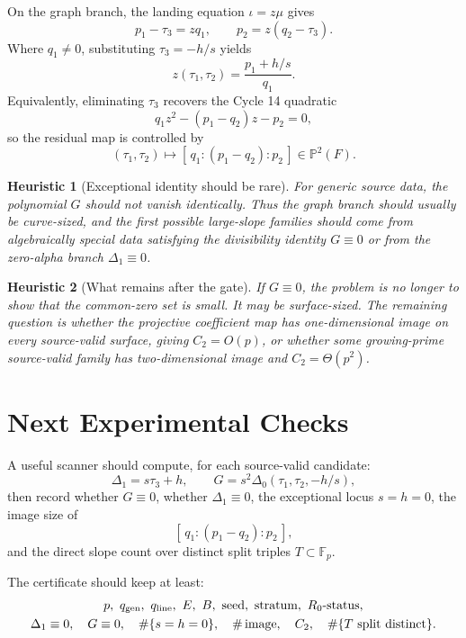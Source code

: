 \documentclass[11pt]{article}
\newtheorem{heuristic}{Heuristic}
\newcommand{\F}{\mathbb F}
\newcommand{\Deltaone}{\Delta_1}
\newcommand{\Deltazero}{\Delta_0}
\newcommand{\tauone}{\tau_1}
\newcommand{\tautwo}{\tau_2}
\newcommand{\tauthree}{\tau_3}
\newcommand{\Ctwo}{C_2}
\newcommand{\qline}{q_{\rm line}}
\newcommand{\qgen}{q_{\rm gen}}
\begin{document}
On the graph branch, the landing equation \(\iota=z\mu\) gives
\[
  p_1-\tauthree=zq_1,\qquad p_2=z(q_2-\tauthree).
\]
Where \(q_1\ne0\), substituting \(\tauthree=-h/s\) yields
\[
  z(\tauone,\tautwo)=\frac{p_1+h/s}{q_1}.
\]
Equivalently, eliminating \(\tauthree\) recovers the Cycle 14 quadratic
\[
  q_1z^2-(p_1-q_2)z-p_2=0,
\]
so the residual map is controlled by
\[
  (\tauone,\tautwo)\longmapsto [\,q_1:(p_1-q_2):p_2\,]\in\mathbb P^2(F).
\]

\begin{heuristic}[Exceptional identity should be rare]
For generic source data, the polynomial \(G\) should not vanish identically.
Thus the graph branch should usually be curve-sized, and the first possible
large-slope families should come from algebraically special data satisfying
the divisibility identity \(G\equiv0\) or from the zero-alpha branch
\(\Deltaone\equiv0\).
\end{heuristic}

\begin{heuristic}[What remains after the gate]
If \(G\equiv0\), the problem is no longer to show that the common-zero set is
small.  It may be surface-sized.  The remaining question is whether the
projective coefficient map has one-dimensional image on every source-valid
surface, giving \(\Ctwo=O(p)\), or whether some growing-prime source-valid
family has two-dimensional image and \(\Ctwo=\Theta(p^2)\).
\end{heuristic}

\section{Next Experimental Checks}

A useful scanner should compute, for each source-valid candidate:
\[
  \Deltaone=s\tauthree+h,\qquad
  G=s^2\Deltazero(\tauone,\tautwo,-h/s),
\]
then record whether \(G\equiv0\), whether \(\Deltaone\equiv0\), the
exceptional locus \(s=h=0\), the image size of
\[
  [\,q_1:(p_1-q_2):p_2\,],
\]
and the direct slope count over distinct split triples \(T\subset\F_p\).

The certificate should keep at least:
\[
\begin{gathered}
  p,\ \qgen,\ \qline,\ E,\ B,\ \text{seed},\ \text{stratum},\
  R_0\text{-status},\\
  \Deltaone\equiv0,\quad G\equiv0,\quad
  \#\{s=h=0\},\quad \#\operatorname{image},\quad
  \Ctwo,\quad \#\{T\text{ split distinct}\}.
\end{gathered}
\]
\end{document}
